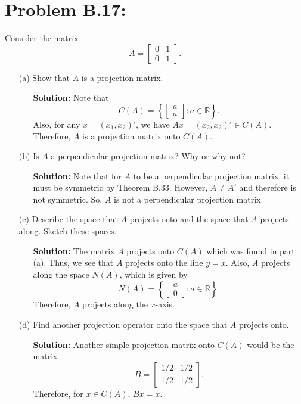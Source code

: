 \documentclass[11pt]{article}
\newcommand{\R}{{\mathbb R}}
\begin{document}
\section*{Problem B.17:}
Consider the matrix
\[
A = \begin{bmatrix}
0 & 1 \\
0 & 1
\end{bmatrix}.
\]
\begin{itemize}
\item[(a)] Show that $A$ is a projection matrix.
\begin{itemize}
\item[] {\bf Solution:}  Note that 
\[
C(A) = \left\{\begin{bmatrix}
a \\ a
\end{bmatrix}\colon a\in\R\right\}.
\]
Also, for any $x = (x_1,x_2)'$, we have $Ax = (x_2,x_2)'\in C(A)$.  Therefore, $A$ is a projection matrix onto $C(A)$.
\end{itemize}
\item[(b)] Is $A$ a perpendicular projection matrix?  Why or why not?
\begin{itemize}
\item[] {\bf Solution:}  Note that for $A$ to be a perpendicular projection matrix, it must be symmetric by Theorem B.33.  However, $A\not= A'$ and therefore is not symmetric.  So, $A$ is not a perpendicular projection matrix.
\end{itemize}
\item[(c)] Describe the space that $A$ projects onto and the space that $A$ projects along.  Sketch these spaces.
\begin{itemize}
\item[] {\bf Solution:}  The matrix $A$ projects onto $C(A)$ which was found in part (a).  Thus, we see that $A$ projects onto the line $y=x$.  Also, $A$ projects along the space $N(A)$, which is given by
\[
N(A) = \left\{\begin{bmatrix}
a \\ 0
\end{bmatrix} \colon a \in \R \right\}.
\]
Therefore, $A$ projects along the $x$-axis.
\end{itemize}
\item[(d)] Find another projection operator onto the space that $A$ projects onto.
\begin{itemize}
\item[] {\bf Solution:}  Another simple projection matrix onto $C(A)$ would be the matrix
\[
B = \begin{bmatrix}
1/2 & 1/2 \\
1/2 & 1/2
\end{bmatrix}.
\]
Therefore, for $x\in C(A)$, $Bx = x$.
\end{itemize}
\end{itemize}
\end{document}
